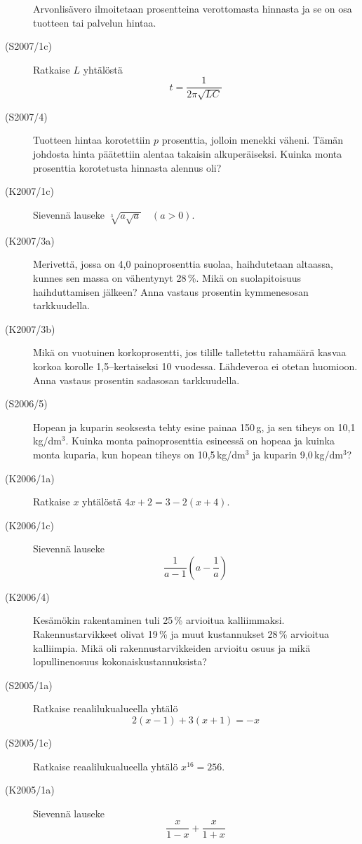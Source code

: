 \begin{description}
                       Arvonlisävero ilmoitetaan prosentteina verottomasta hinnasta ja se on osa tuotteen tai palvelun hintaa.
    \item[(S2007/1c)]  Ratkaise $L$ yhtälöstä
                           \[ t = \frac{1}{2\pi\sqrt{LC}} \]
    \item[(S2007/4)]   Tuotteen hintaa korotettiin $p$ prosenttia, jolloin menekki väheni. Tämän johdosta hinta päätettiin
                       alentaa takaisin alkuperäiseksi. Kuinka monta prosenttia korotetusta hinnasta alennus oli?
    \item[(K2007/1c)]  Sievennä lauseke $ \sqrt[3]{a \sqrt{a}} \quad (a > 0) $.
    \item[(K2007/3a)]  Merivettä, jossa on 4,0 painoprosenttia suolaa, haihdutetaan altaassa, kunnes sen massa on
                       vähentynyt 28\,\%. Mikä on suolapitoisuus haihduttamisen jälkeen? Anna vastaus prosentin
                       kymmenesosan tarkkuudella. 
    \item[(K2007/3b)]  Mikä on vuotuinen korkoprosentti, jos tilille talletettu rahamäärä kasvaa korkoa korolle 1,5--kertaiseksi
                       10 vuodessa. Lähdeveroa ei otetan huomioon. Anna vastaus prosentin sadasosan tarkkuudella.
    \item[(S2006/5)]   Hopean ja kuparin seoksesta tehty esine painaa 150\,g, ja sen tiheys on 10,1\,kg/dm\(^3\). Kuinka monta
                       painoprosenttia esineessä on hopeaa ja kuinka monta kuparia, kun hopean tiheys on 10,5\,kg/dm\(^3\) ja kuparin
                       9,0\,kg/dm\(^3\)?
    \item[(K2006/1a)]  Ratkaise $x$ yhtälöstä $4x + 2 =  3 - 2(x + 4)$.
    \item[(K2006/1c)]  Sievennä lauseke 
                       \[ \frac{1}{a - 1} \left( a - \frac{1}{a} \right) \]
    \item[(K2006/4)]   Kesämökin rakentaminen tuli 25\,\% arvioitua kalliimmaksi. Rakennustarvikkeet olivat 19\,\% ja muut
                       kustannukset 28\,\% arvioitua kalliimpia. Mikä oli rakennustarvikkeiden arvioitu osuus ja mikä
                       lopullinenosuus kokonaiskustannuksista?
    \item[(S2005/1a)]  Ratkaise reaalilukualueella yhtälö 
                        \[ 2(x - 1) + 3(x + 1 ) = -x \]
    \item[(S2005/1c)]  Ratkaise reaalilukualueella yhtälö $ x^{16} = 256 $.
    \item[(K2005/1a)]  Sievennä lauseke
                        \[ \frac{x}{1 - x} + \frac{x}{1 + x} \]

\end{description}

